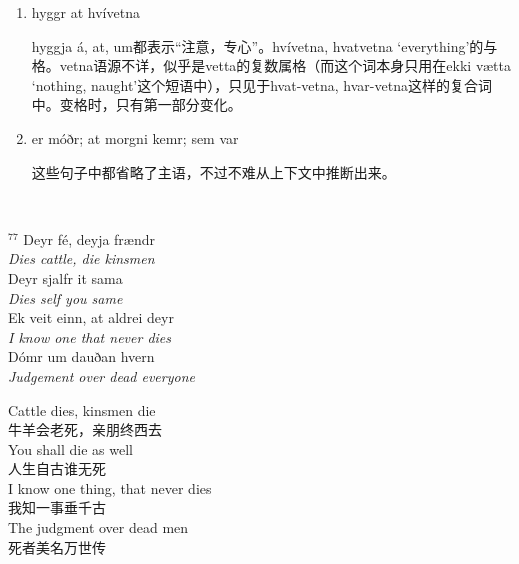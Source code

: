\begin{grammar*}{}
    \begin{enumerate}[leftmargin=*]

        \item hyggr at hvívetna

              hyggja {\'a}, at, um都表示“注意，专心”。hvívetna, hvatvetna `everything'的与格。vetna语源不详，似乎是vetta的复数属格（而这个词本身只用在ekki vætta `nothing, naught'这个短语中），只见于hvat-vetna, hvar-vetna这样的复合词中。变格时，只有第一部分变化。

        \item er móðr; at morgni kemr; sem var

              这些句子中都省略了主语，不过不难从上下文中推断出来。
    \end{enumerate}
\end{grammar*}
\hspace*{\fill}\\ %
\begin{paracol}{2}
    \noindent
    $^{77}$ Deyr fé, deyja frændr\\
    \textit{Dies cattle, die kinsmen}\\
    Deyr sjalfr it sama\\
    \textit{Dies self you same}\\
    Ek veit einn, at aldrei deyr\\
    \textit{I know one that never dies}\\
    Dómr um dauðan hvern\\
    \textit{Judgement over dead everyone}\\
    \switchcolumn

    \noindent
    Cattle dies, kinsmen die\\
    牛羊会老死，亲朋终西去\\
    You shall die as well\\
    人生自古谁无死\\
    I know one thing, that never dies\\
    我知一事垂千古\\
    The judgment over dead men\\
    死者美名万世传\\

\end{paracol}

